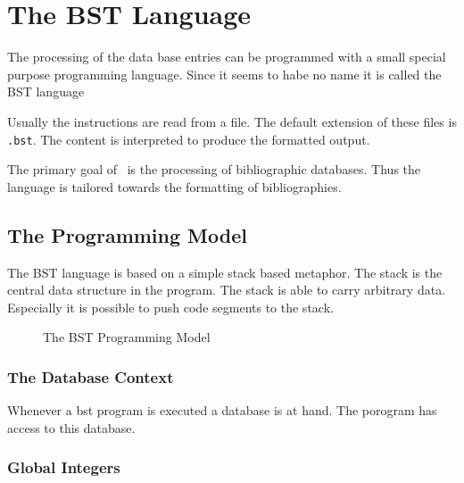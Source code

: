 
\chapter{The BST Language}

%
The processing of the data base entries can be programmed with a small
special purpose programming language. Since it seems to habe no name
it is called the BST language

Usually the instructions are read from a file. The default extension
of these files is \texttt{.bst}. The content is interpreted to produce
the formatted output.

The primary goal of \BibTeX\ is the processing of bibliographic
databases. Thus the language is tailored towards the formatting of
bibliographies.

\section{The Programming Model}

The BST language is based on a simple stack based metaphor. The stack
is the central data structure in the program. The stack is able to
carry arbitrary data. Especially it is possible to push code segments
to the stack.

\begin{figure}[tb]
  \centering
  
  \caption{The BST Programming Model}
  \label{fig:bst-model}
\end{figure}


\subsection{The Database Context}

Whenever a bst program is executed a database is at hand. The porogram
has access to this database.

\INCOMPLETE

\subsection{Global Integers}

